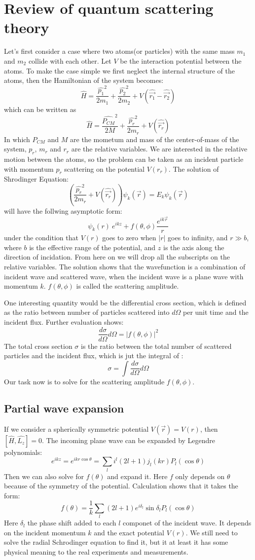 \documentclass{article}
\begin{document}
\section{Review of quantum scattering theory}
Let's first consider a case where two atoms(or particles) with the same mass $m_1$ and $m_2$ collide with each other. Let $V$ be the interaction potential between the atoms. To make the case simple we first neglect the internal structure of the atoms, then the Hamiltonian of the system becomes: 
$$ \hat{H}=\frac{\hat{p_1}^2}{2m_1}+\frac{\hat{p_2}^2}{2m_2}+V(\hat{\vec{r_1}}-\hat{\vec{r_2}}) $$
which can be written as
$$ \hat{H}=\frac{\hat{P_{CM}}^2}{2M}+\frac{\hat{p_{r}}^2}{2m_{r}}+V(\hat{\vec{r_{r}}}) $$
In which $P_{CM}$ and $M$ are the mometum and mass of the center-of-mass of the system, $p_r$, $m_r$ and $r_r$ are the relative variables. We are interested in the relative motion between the atoms, so the problem can be taken as an incident particle with momentum $p_{r}$ scattering on the potential $V(r_{r})$. The solution of Shrodinger Equation:
$$ (\frac{\hat{p_{r}}^2}{2m_{r}}+V(\hat{\vec{r_{r}}}))\psi_k(\vec{r})=E_k\psi_k(\vec{r})$$ 
will have the follwing asymptotic form:
$$\psi_k(r){~}e^{ikz}+f(\theta,\phi)\frac{e^{ik\vec{r}}}{r}$$
under the condition that $V(r)$ goes to zero when $|r|$ goes to infinity, and $r\gg b$, where $b$ is the effective range of the potential, and $z$ is the axis along the direction of incidation. From here on we will drop all the subscripts on the relative variables. The solution shows that the wavefunction is a combination of incident wave and scattered wave, when the incident wave is a plane wave with momentum $k$. $f(\theta,\phi)$ is called the scattering amplitude. 

One interesting quantity would be the differential cross section, which is defined as the ratio between number of particles scattered into $d\Omega$ per unit time and the incident flux. Further evaluation shows:
$$\frac{d\sigma}{d\Omega}d\Omega=|f(\theta,\phi)|^2$$
The total cross section $\sigma$ is the ratio between the total number of scattered particles and the incident flux, which is jut the integral of  :
$$\sigma=\int{\frac{d\sigma}{d\Omega}d\Omega}$$
Our task now is to solve for the scattering amplitude $f(\theta,\phi)$.
\subsection{Partial wave expansion}
 If we consider a spherically symmetric potential $V(\vec{r})=V(r)$, then $[\hat{H},\hat{L_z}]=0$. The incoming plane wave can be expanded by Legendre polynomials:
$$e^{ikz}=e^{ikr\cos{\theta}}=\sum_{l}i^l(2l+1)j_l(kr)P_l(\cos{\theta})$$
Then we can also solve for $f(\theta)$ and expand it. Here $f$ only depends on $\theta$ because of the symmetry of the potential. Calculation shows that it takes the form:
$$f(\theta)=\frac{1}{k}\sum_{l}(2l+1)e^{i\delta_l}\sin{\delta_l}P_l(\cos{\theta})$$
Here $\delta_l$ the phase shift added to each $l$ componet of the incident wave. It depends on the incident momentum $k$ and the exact potential $V(r)$. We still need to solve the radial Schrodinger equation to find it, but it at least it has some physical meaning to the real experiments and measurements. 
\end{document}
